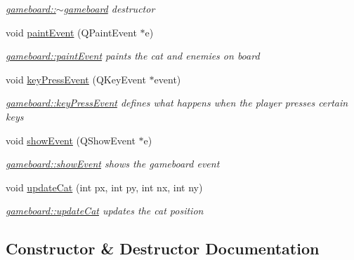 \begin{DoxyCompactItemize}
\begin{DoxyCompactList}\small\item\em \hyperlink{classgameboard_ac10e30eecd45bb004a592f97bd0e398f}{gameboard\+::$\sim$gameboard} destructor \end{DoxyCompactList}\item 
void \hyperlink{classgameboard_a7c2f3cab761a2d642a0f0fb2b430a21d}{paint\+Event} (Q\+Paint\+Event $\ast$e)
\begin{DoxyCompactList}\small\item\em \hyperlink{classgameboard_a7c2f3cab761a2d642a0f0fb2b430a21d}{gameboard\+::paint\+Event} paints the cat and enemies on board \end{DoxyCompactList}\item 
void \hyperlink{classgameboard_a426162fac3b314115067be644865cdaf}{key\+Press\+Event} (Q\+Key\+Event $\ast$event)
\begin{DoxyCompactList}\small\item\em \hyperlink{classgameboard_a426162fac3b314115067be644865cdaf}{gameboard\+::key\+Press\+Event} defines what happens when the player presses certain keys \end{DoxyCompactList}\item 
void \hyperlink{classgameboard_a62459809a28e3835f62a5311f13e22eb}{show\+Event} (Q\+Show\+Event $\ast$e)
\begin{DoxyCompactList}\small\item\em \hyperlink{classgameboard_a62459809a28e3835f62a5311f13e22eb}{gameboard\+::show\+Event} shows the gameboard event \end{DoxyCompactList}\item 
void \hyperlink{classgameboard_acd4d2cbede5463c4a8c42962766ffe87}{update\+Cat} (int px, int py, int nx, int ny)
\begin{DoxyCompactList}\small\item\em \hyperlink{classgameboard_acd4d2cbede5463c4a8c42962766ffe87}{gameboard\+::update\+Cat} updates the cat position \end{DoxyCompactList}\end{DoxyCompactItemize}


\subsection{Constructor \& Destructor Documentation}
\hypertarget{classgameboard_a45936725b978fc6548d0ad9e62b70d95}{}
